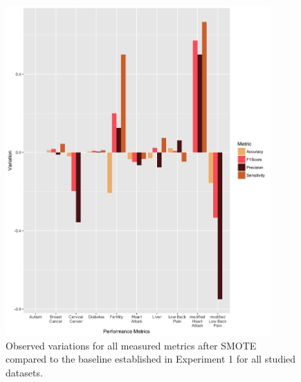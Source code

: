 \begin{figure}[!htbp]
    \centering
    \includegraphics[width=0.9\textwidth]{ThesisTemplate/usingLatex/chapter5Images/OverVariations.png}
    \caption{Observed variations for all measured metrics after SMOTE compared to the baseline established in Experiment 1 for all studied datasets.}
    \label{fig:my_label}
\end{figure}


